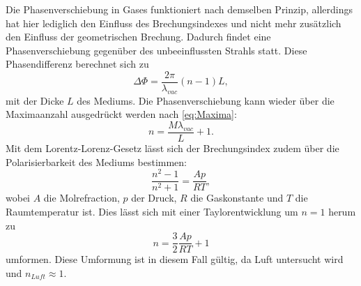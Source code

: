 Die Phasenverschiebung in Gases funktioniert nach demselben Prinzip, allerdings hat hier lediglich den Einfluss des Brechungsindexes und nicht mehr zusätzlich
den Einfluss der geometrischen Brechung.
Dadurch findet eine Phasenverschiebung gegenüber des unbeeinflussten Strahls statt. Diese Phasendifferenz berechnet sich zu 
\begin{equation}
    \Delta \Phi = \frac{2\pi}{\lambda_{vac}}(n-1)L,
\end{equation}
mit der Dicke $L$ des Mediums. Die Phasenverschiebung kann wieder über die Maximaanzahl ausgedrückt werden nach \autoref{eq:Maxima}:
\begin{equation}
    n = \frac{M \lambda_{vac}}{L} + 1.
\end{equation}
Mit dem Lorentz-Lorenz-Gesetz lässt sich der Brechungsindex zudem über die Polarisierbarkeit des Mediums bestimmen:
\begin{equation}
    \frac{n^2-1}{n^2+1} = \frac{A p}{R T},
\end{equation}
wobei $A$ die Molrefraction, $p$ der Druck, $R$ die Gaskonstante und $T$ die Raumtemperatur ist. Dies lässt sich mit einer Taylorentwicklung 
um $n=1$ herum zu 
\begin{equation}
    n = \frac{3}{2} \frac{A p}{R T} + 1
\end{equation}
umformen. Diese Umformung ist in diesem Fall gültig, da Luft untersucht wird und $n_{Luft} \approx 1$.

